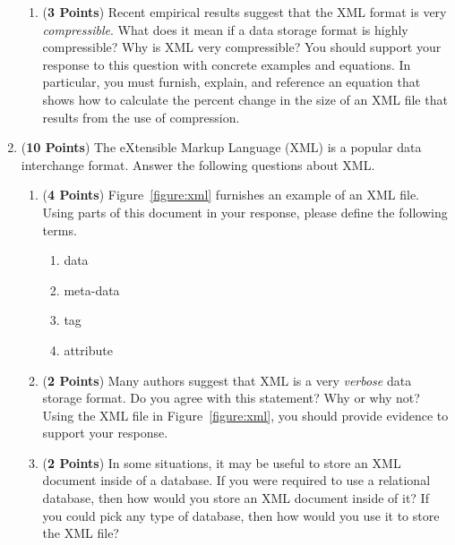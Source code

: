 \documentclass[12pt]{article}
\begin{document}
\begin{enumerate}
\begin{enumerate}
    \item ({\bf 3 Points}) Recent empirical results suggest that the XML format is very {\em compressible}.  What does
      it mean if a data storage format is highly compressible?  Why is XML very compressible?  You should support your
      response to this question with concrete examples and equations.  In particular, you must furnish, explain, and
      reference an equation that shows how to calculate the percent change in the size of an XML file that results from
      the use of compression. 

    \end{enumerate}

\newpage

\item ({\bf 10 Points}) The eXtensible Markup Language (XML) is a
  popular data interchange format.  Answer the following questions
  about XML.

  \begin{enumerate}
    
    \item ({\bf 4 Points}) Figure~\ref{figure:xml} furnishes an
      example of an XML file.  Using parts of this document in your
      response, please define the following terms.

      \begin{enumerate}

        \item data

        \item meta-data

        \item tag

        \item attribute

      \end{enumerate}

  \item ({\bf 2 Points}) Many authors suggest that XML is a very {\em verbose} data storage format.  Do you agree with
    this statement?  Why or why not? Using the XML file in Figure~\ref{figure:xml}, you should provide evidence to
    support your response.

  \item ({\bf 2 Points}) In some situations, it may be useful to store an XML document inside of a database.  If you
    were required to use a relational database, then how would you store an XML document inside of it?  If you could
    pick any type of database, then how would you use it to store the XML file?


\end{enumerate}
\end{enumerate}
\end{document}
